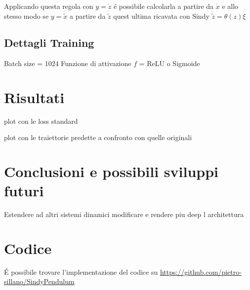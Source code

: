 \documentclass[11pt]{article}
\begin{document}
Applicando questa regola con $y = \dot{z} $ é possibile calcolarla a partire da $\dot{x}$ e allo stesso modo se $y = \dot{\tilde{x}}$ a partire da $\dot{\tilde{z}}$ quest ultima ricavata con Sindy $\dot{\tilde{z}} = \theta(z)\xi$

\subsection{Dettagli Training}
Batch size = 1024
Funzione di attivazione $f$ = ReLU o Sigmoide

\section{Risultati}
plot con le loss standard

plot con le traiettorie predette a confronto con quelle originali


\section{Conclusioni e possibili sviluppi futuri}
Estendere ad altri sistemi dinamici
modificare e rendere piu deep l architettura






\section{Codice}
É possibile trovare l'implementazione del codice su \url{https://github.com/pietro-sillano/SindyPendulum}
\end{document}
